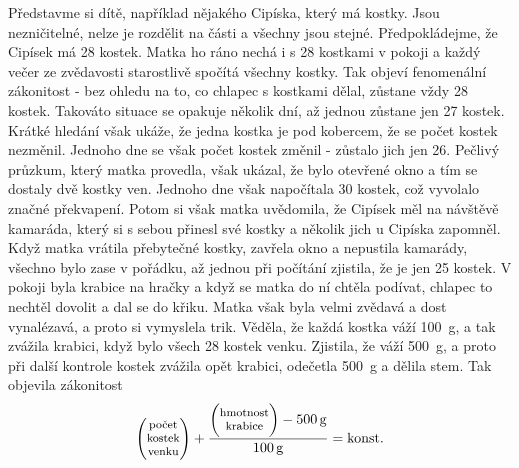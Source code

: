     Představme si dítě, například nějakého Cipíska, který má kostky. Jsou nezničitelné, nelze je 
    rozdělit na části a všechny jsou stejné. Předpokládejme, že Cipísek má \num{28} kostek. Matka 
    ho ráno nechá i s \num{28} kostkami v pokoji a každý večer ze zvědavosti starostlivě spočítá 
    všechny kostky. Tak objeví fenomenální zákonitost - bez ohledu na to, co chlapec s kostkami 
    dělal, zůstane vždy \num{28} kostek. Takováto situace se opakuje několik dní, až jednou zůstane 
    jen \num{27} kostek. Krátké hledání však ukáže, že jedna kostka je pod kobercem, že se počet 
    kostek nezměnil. Jednoho dne se však počet kostek změnil - zůstalo jich jen \num{26}. Pečlivý 
    průzkum, který matka provedla, však ukázal, že bylo otevřené okno a tím se dostaly dvě kostky 
    ven. Jednoho dne však napočítala \num{30} kostek, což vyvolalo značné překvapení. Potom si však 
    matka uvědomila, že Cipísek měl na návštěvě kamaráda, který si s sebou přinesl své kostky a 
    několik jich u Cipíska zapomněl. Když matka vrátila přebytečné kostky, zavřela okno a nepustila 
    kamarády, všechno bylo zase v pořádku, až jednou při počítání zjistila, že je jen \num{25} 
    kostek. V pokoji byla krabice na hračky a když se matka do ní chtěla podívat, chlapec to 
    nechtěl dovolit a dal se do křiku. Matka však byla velmi zvědavá a dost vynalézavá, a proto si 
    vymyslela trik. Věděla, že každá kostka váží \SI{100}{\gram}, a tak zvážila krabici, když bylo 
    všech \num{28} kostek venku. Zjistila, že váží \SI{500}{\gram}, a proto při další kontrole 
    kostek zvážila opět krabici, odečetla \SI{500}{\gram} a dělila stem. Tak objevila zákonitost
    \begin{equation*}
      \renewcommand{\arraystretch}{0.8}
        \begin{pmatrix} 
          \text{\footnotesize{počet}}   \\
          \text{\footnotesize{kostek}}  \\
          \text{\footnotesize{venku}}
        \end{pmatrix}   +
      \frac{
        \begin{pmatrix}
          \text{\footnotesize{hmotnost}}  \\
          \text{\footnotesize{krabice}}
        \end{pmatrix}
        - \SI{500}{\gram}}{ \SI{100}{\gram}} = 
      \text{konst.}
    \end{equation*}
    
